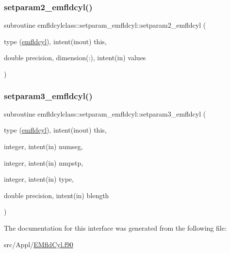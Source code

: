 \mbox{\label{interfaceemfldcylclass_1_1setparam__emfldcyl_a15b0af2713585b7527d5fa5edd6f6fda}} 
\subsubsection{\texorpdfstring{setparam2\_emfldcyl()}{setparam2\_emfldcyl()}}
{\footnotesize\ttfamily subroutine emfldcylclass\+::setparam\+\_\+emfldcyl\+::setparam2\+\_\+emfldcyl (\begin{DoxyParamCaption}\item[{type (\mbox{\hyperlink{namespaceemfldcylclass_structemfldcylclass_1_1emfldcyl}{emfldcyl}}), intent(inout)}]{this,  }\item[{double precision, dimension(\+:), intent(in)}]{values }\end{DoxyParamCaption})}

\mbox{\label{interfaceemfldcylclass_1_1setparam__emfldcyl_a3165039bca593a44285d18f0629ec79d}} 
\subsubsection{\texorpdfstring{setparam3\_emfldcyl()}{setparam3\_emfldcyl()}}
{\footnotesize\ttfamily subroutine emfldcylclass\+::setparam\+\_\+emfldcyl\+::setparam3\+\_\+emfldcyl (\begin{DoxyParamCaption}\item[{type (\mbox{\hyperlink{namespaceemfldcylclass_structemfldcylclass_1_1emfldcyl}{emfldcyl}}), intent(inout)}]{this,  }\item[{integer, intent(in)}]{numseg,  }\item[{integer, intent(in)}]{nmpstp,  }\item[{integer, intent(in)}]{type,  }\item[{double precision, intent(in)}]{blength }\end{DoxyParamCaption})}



The documentation for this interface was generated from the following file\+:\begin{DoxyCompactItemize}
\item 
src/\+Appl/\mbox{\hyperlink{_e_mfld_cyl_8f90}{E\+Mfld\+Cyl.\+f90}}\end{DoxyCompactItemize}
